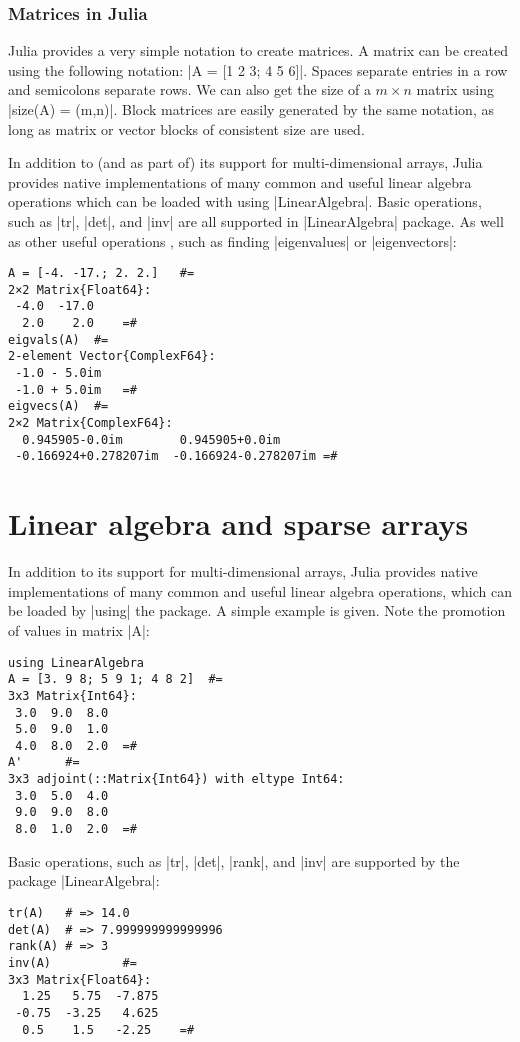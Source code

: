 \subsubsection*{Matrices in Julia}

Julia provides a very simple notation to create matrices. A matrix can be created using the following notation: |A = [1 2 3; 4 5 6]|. Spaces separate entries in a row and semicolons separate rows. We can also get the size of a $m\times n$ matrix using |size(A) = (m,n)|. Block matrices are easily generated by the same notation, as long as matrix or vector blocks of consistent size are used.

In addition to (and as part of) its support for multi-dimensional arrays, Julia provides native implementations of many common and useful linear algebra operations which can be loaded with using |LinearAlgebra|. Basic operations, such as |tr|, |det|, and |inv| are all supported in |LinearAlgebra| package. As well as other useful operations \cite{julia:linearalgebra}, such as finding |eigenvalues| or |eigenvectors|:
\begin{lstlisting}[language=JuliaLocal, style=julia, mathescape=true]
A = [-4. -17.; 2. 2.]	#=
2×2 Matrix{Float64}:
 -4.0  -17.0
  2.0    2.0	=#
eigvals(A)	#=
2-element Vector{ComplexF64}:
 -1.0 - 5.0im
 -1.0 + 5.0im	=#
eigvecs(A)	#=
2×2 Matrix{ComplexF64}:
  0.945905-0.0im        0.945905+0.0im
 -0.166924+0.278207im  -0.166924-0.278207im	=#
\end{lstlisting}


\section{Linear algebra and sparse arrays}\label{sect:1-4}

In addition to its support for multi-dimensional arrays, Julia provides native implementations of many common and useful linear algebra operations, which can be loaded by |using| the package. A simple example is given. Note the promotion of values in matrix |A|:
\begin{lstlisting}[language=JuliaLocal, style=julia]
using LinearAlgebra
A = [3. 9 8; 5 9 1; 4 8 2] 	#= 
3x3 Matrix{Int64}:
 3.0  9.0  8.0
 5.0  9.0  1.0
 4.0  8.0  2.0	=#
A'  	#= 
3x3 adjoint(::Matrix{Int64}) with eltype Int64:
 3.0  5.0  4.0
 9.0  9.0  8.0
 8.0  1.0  2.0	=#
\end{lstlisting}
Basic operations, such as |tr|, |det|, |rank|, and |inv| are  supported by the package 
|LinearAlgebra|:
\begin{lstlisting}[language=JuliaLocal, style=julia]
tr(A)   # => 14.0
det(A)  # => 7.999999999999996
rank(A) # => 3
inv(A)   		#=
3x3 Matrix{Float64}:
  1.25   5.75  -7.875
 -0.75  -3.25   4.625
  0.5    1.5   -2.25 	=#
\end{lstlisting}

